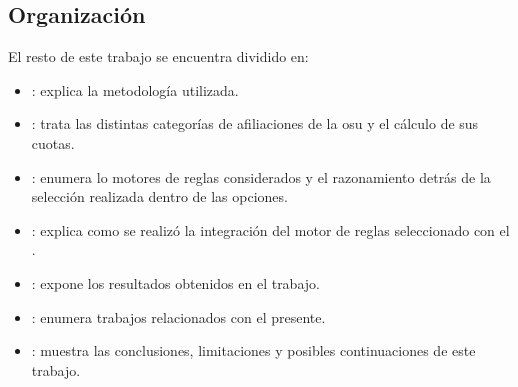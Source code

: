 \subsection{Organización}
El resto de este trabajo se encuentra dividido en:
\begin{itemize}
    \item {}: explica la metodología utilizada.
    \item {}: trata las distintas categorías de afiliaciones de la \acrshort{osu} y el cálculo de sus cuotas.
    \item {}: enumera lo motores de reglas considerados y el razonamiento detrás de la selección realizada dentro de las opciones.
    \item {}: explica como se realizó la integración del motor de reglas seleccionado con el {\SIOSU}.
    \item {}: expone los resultados obtenidos en el trabajo.
    \item {}: enumera trabajos relacionados con el presente.
    \item {}: muestra las conclusiones, limitaciones y posibles continuaciones de este trabajo.
\end{itemize}

